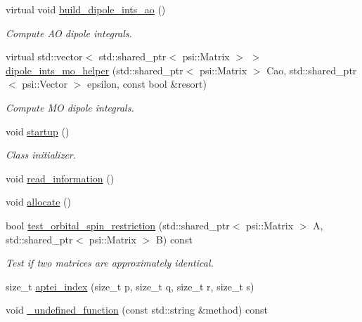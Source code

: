 \begin{DoxyCompactItemize}
\item 
virtual void \mbox{\hyperlink{classforte_1_1_forte_integrals_a5b27ca75c026c350cdeb81fd64337c0c}{build\+\_\+dipole\+\_\+ints\+\_\+ao}} ()
\begin{DoxyCompactList}\small\item\em Compute AO dipole integrals. \end{DoxyCompactList}\item 
virtual std\+::vector$<$ std\+::shared\+\_\+ptr$<$ psi\+::\+Matrix $>$ $>$ \mbox{\hyperlink{classforte_1_1_forte_integrals_ad459b61022f3cc816f471e11022e1047}{dipole\+\_\+ints\+\_\+mo\+\_\+helper}} (std\+::shared\+\_\+ptr$<$ psi\+::\+Matrix $>$ Cao, std\+::shared\+\_\+ptr$<$ psi\+::\+Vector $>$ epsilon, const bool \&resort)
\begin{DoxyCompactList}\small\item\em Compute MO dipole integrals. \end{DoxyCompactList}\item 
void \mbox{\hyperlink{classforte_1_1_forte_integrals_a953cb77df89721c19595a9d1ee3b7332}{startup}} ()
\begin{DoxyCompactList}\small\item\em Class initializer. \end{DoxyCompactList}\item 
void \mbox{\hyperlink{classforte_1_1_forte_integrals_a0043eed3580cf4160134e65538f82e59}{read\+\_\+information}} ()
\item 
void \mbox{\hyperlink{classforte_1_1_forte_integrals_af9a0455b8cc8cf9482b5ee9c051161f2}{allocate}} ()
\item 
bool \mbox{\hyperlink{classforte_1_1_forte_integrals_ac2a413788a731cc2c48df947862bc964}{test\+\_\+orbital\+\_\+spin\+\_\+restriction}} (std\+::shared\+\_\+ptr$<$ psi\+::\+Matrix $>$ A, std\+::shared\+\_\+ptr$<$ psi\+::\+Matrix $>$ B) const
\begin{DoxyCompactList}\small\item\em Test if two matrices are approximately identical. \end{DoxyCompactList}\item 
size\+\_\+t \mbox{\hyperlink{classforte_1_1_forte_integrals_a39cf39d6554a2ca4a4338ffda7500426}{aptei\+\_\+index}} (size\+\_\+t p, size\+\_\+t q, size\+\_\+t r, size\+\_\+t s)
\item 
void \mbox{\hyperlink{classforte_1_1_forte_integrals_a0013fb3e33eeeb1774569b4c442d8080}{\+\_\+undefined\+\_\+function}} (const std\+::string \&method) const

\end{DoxyCompactItemize}
